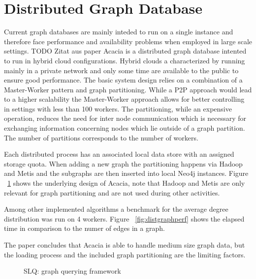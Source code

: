 \documentclass{sig-alternate}
\begin{document}
\section{Distributed Graph Database}
Current graph databases are mainly inteded to run on a single instance and therefore
face performance and availability problems when employed in large scale settings. TODO Zitat aus paper 
Acacia is a distributed graph database intented to run in hybrid cloud configurations.
Hybrid clouds a characterized by running mainly in a private network and only
some time are available to the public to ensure good performance.
The basic system design relies on a combination of a Master-Worker pattern 
and graph partitioning. While a P2P approach would lead to a higher scalability
the Master-Worker approach allows for better controlling in settings with less than 100 workers.
The partitioning, while an expensive operation, reduces the need for inter node communication
which is necessary for exchanging information concerning nodes which lie outside of a graph partition.
The number of partitions corresponds to the number of workers.

Each distributed process has an associated local data store with an assigned storage quota.
When adding a new graph the partitioning happens via Hadoop and Metis and the subgraphs are then inserted into local
Neo4j instances. Figure ~\ref{fig:distgraph} shows the underlying design of Acacia, note that Hadoop and Metis 
are only relevant for graph partitioning and are not used during other 
activities.

Among other implemented algorithms a benchmark for the average degree distribution was run on 4 workers.
Figure ~\ref{fig:distgraphperf} shows the elapsed time in comparison to the numer of edges in a graph.

The paper concludes that Acacia is able to handle medium size graph data, but the loading process and 
the included graph partitioning are the limiting factors.

\begin{figure}
\centering
{}
\caption{SLQ: graph querying framework}
\label{fig:distgraph}
\end{figure}
\end{document}
